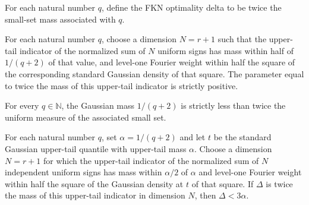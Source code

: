 \begin{definition}
\label{FABL.fknOptimalityDelta}
\leanok
{}
For each natural number $q$, define the FKN optimality delta to be twice the small-set
mass associated with $q$.
\end{definition}

\begin{theorem}
\label{FABL.fknOptimalityDelta_pos}
\leanok
{}
For each natural number $q$, choose a dimension $N=r+1$ such that the upper-tail
indicator of the normalized sum of $N$ uniform signs has mass within half of $1/(q+2)$
of that value, and level-one Fourier weight within half the square of the corresponding
standard Gaussian density of that square. The parameter equal to twice the mass of this
upper-tail indicator is strictly positive.
\end{theorem}

\begin{theorem}
\label{FABL.fknOptimalityGaussianMass_lt_delta}
\leanok
{}
For every $q\in\mathbb{N}$, the Gaussian mass $1/(q+2)$ is strictly less than twice the
uniform measure of the associated small set.
\end{theorem}

\begin{theorem}
\label{FABL.fknOptimalityDelta_lt_three_mul_gaussianMass}
\leanok
{}
For each natural number $q$, set $\alpha=1/(q+2)$ and let $t$ be the standard Gaussian
upper-tail quantile with upper-tail mass $\alpha$. Choose a dimension $N=r+1$ for which
the upper-tail indicator of the normalized sum of $N$ independent uniform signs has mass
within $\alpha/2$ of $\alpha$ and level-one Fourier weight within half the square of the
Gaussian density at $t$ of that square. If $\Delta$ is twice the mass of this upper-tail
indicator in dimension $N$, then $\Delta<3\alpha$.
\end{theorem}

